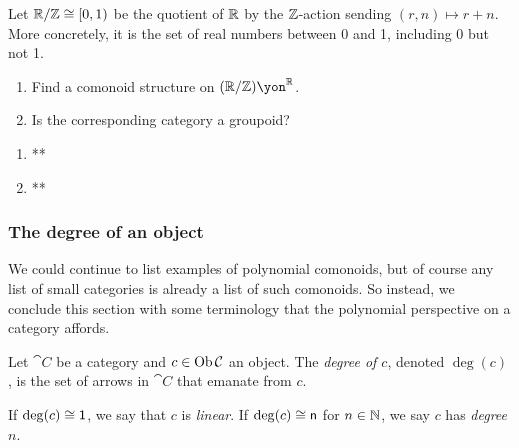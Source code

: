 \documentclass[Book-Poly]{subfiles}
\begin{document}
\begin{exercise}
Let $\mathbb{R}/\mathbb{Z}\cong[0,1)$ be the quotient of $\mathbb{R}$ by the $\mathbb{Z}$-action sending $(r,n)\mapsto r+n$. 
More concretely, it is the set of real numbers between 0 and 1, including 0 but not 1.
\begin{enumerate}
	\item Find a comonoid structure on $(\rr/\zz)\yon^\rr$.
	\item Is the corresponding category a groupoid?
\qedhere
\end{enumerate}
\begin{solution}
\begin{enumerate}
    \item **
    \item **
\end{enumerate}
\end{solution}
\end{exercise}


\subsubsection{The degree of an object}

We could continue to list examples of polynomial comonoids, but of course any list of small categories is already a list of such comonoids.
So instead, we conclude this section with some terminology that the polynomial perspective on a category affords.

\begin{definition}
Let $\cat{C}$ be a category and $c\in\operatorname{Ob}\mathcal{C}$ an object. The \emph{degree of $c$}, denoted $\deg(c)$, is the set of arrows in $\cat{C}$ that emanate from $c$.

If $\deg(c)\cong\textsf{1}$, we say that $c$ is \emph{linear}.
If $\deg(c)\cong\mathsf{n}$ for $n\in\mathbb{N}$, we say $c$ has \emph{degree $n$}.
\end{definition}
\end{document}
